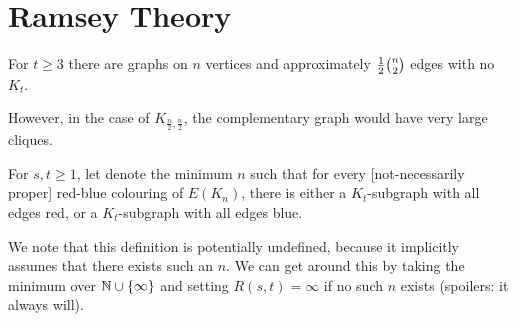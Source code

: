\documentclass[main.tex]{subfiles}
\begin{document}
\section{Ramsey Theory}
\begin{recall*}
  For $t\geq 3$ there are graphs on $n$ vertices and approximately
  $\frac{1}{2}\binom n 2$ edges with no $K_t$.
\end{recall*}
However, in the case of $K_{\frac n 2,\frac n 2}$, the complementary graph
would have very large cliques.
\begin{definition*}[$R(s,t)$]
  For $s,t\geq 1$, let  denote the minimum $n$ such
  that for every [not-necessarily proper] red-blue colouring of $E(K_n)$,
  there is either a $K_t$-subgraph with all edges red, or a $K_t$-subgraph with
  all edges blue.
\end{definition*}
We note that this definition is potentially undefined, because it implicitly
assumes that there exists such an $n$.
We can get around this by taking the minimum over $\mathbb N\cup\{\infty\}$ and setting
$R(s,t) = \infty$ if no such $n$ exists (spoilers: it always will).
\end{document}
